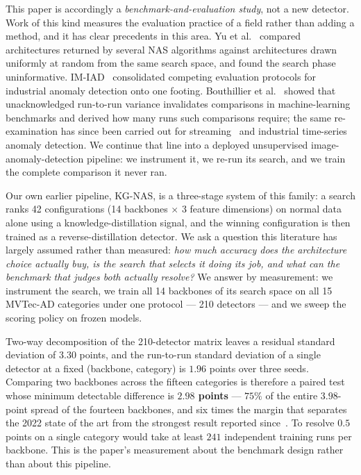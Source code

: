 This paper is accordingly a \emph{benchmark-and-evaluation study}, not a new
detector. Work of this kind measures the evaluation practice of a field rather
than adding a method, and it has clear precedents in this area. Yu et
al.~\cite{yu2020evaluating} compared architectures returned by several NAS
algorithms against architectures drawn uniformly at random from the same search
space, and found the search phase uninformative. IM-IAD~\cite{xie2024imiad}
consolidated competing evaluation protocols for industrial anomaly detection onto
one footing. Bouthillier et al.~\cite{bouthillier2021accounting} showed that
unacknowledged run-to-run variance invalidates comparisons in machine-learning
benchmarks and derived how many runs such comparisons require; the same
re-examination has since been carried out for
streaming~\cite{cao2024revisiting} and industrial time-series~\cite{yu2026eventlevel}
anomaly detection. We continue that line into a deployed unsupervised
image-anomaly-detection pipeline: we instrument it, we re-run its search, and we
train the complete comparison it never ran.

Our own earlier pipeline, KG-NAS, is a three-stage system of this family: a search
ranks 42 configurations (14 backbones $\times$ 3 feature dimensions) on normal
data alone using a knowledge-distillation signal, and the winning configuration is
then trained as a reverse-distillation detector. We ask a question this literature
has largely assumed rather than measured: \emph{how much accuracy does the
architecture choice actually buy, is the search that selects it doing its job, and
what can the benchmark that judges both actually resolve?} We answer by
measurement: we instrument the search, we train all 14 backbones of its search
space on all 15 MVTec-AD categories under one protocol --- 210 detectors --- and
we sweep the scoring policy on frozen models.

Two-way decomposition of the 210-detector matrix leaves a residual standard
deviation of $3.30$ points, and the run-to-run standard deviation of a single
detector at a fixed (backbone, category) is $1.96$ points over three seeds.
Comparing two backbones across the fifteen categories is therefore a paired test
whose minimum detectable difference is \textbf{$2.98$ points} --- $75\%$ of the
entire $3.98$-point spread of the fourteen backbones, and six times the margin
that separates the 2022 state of the art from the strongest result reported
since~\cite{roth2022patchcore,guo2025dinomaly}. To resolve $0.5$ points on a
single category would take at least $241$ independent training runs per backbone.
This is
the paper's measurement about the benchmark design rather than about this
pipeline.

